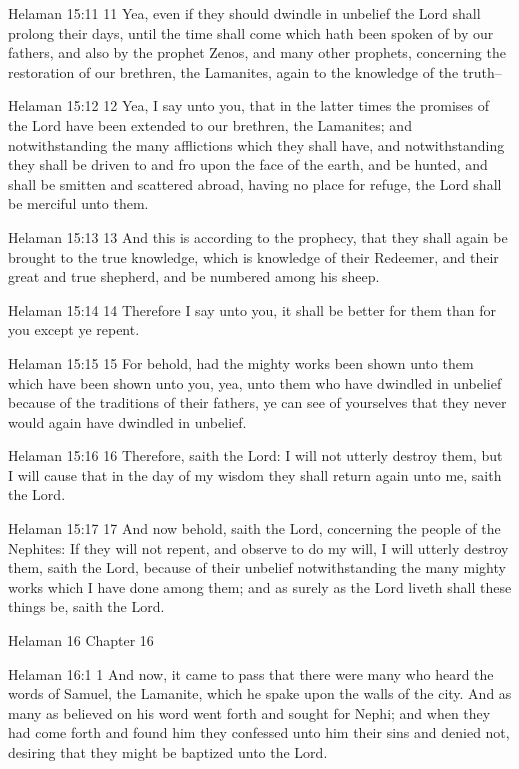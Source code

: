 Helaman 15:11
 11 Yea, even if they should dwindle in unbelief the Lord shall
prolong their days, until the time shall come which hath been
spoken of by our fathers, and also by the prophet Zenos, and many
other prophets, concerning the restoration of our brethren, the
Lamanites, again to the knowledge of the truth--

Helaman 15:12
 12 Yea, I say unto you, that in the latter times the promises of
the Lord have been extended to our brethren, the Lamanites; and
notwithstanding the many afflictions which they shall have, and
notwithstanding they shall be driven to and fro upon the face of
the earth, and be hunted, and shall be smitten and scattered
abroad, having no place for refuge, the Lord shall be merciful
unto them.

Helaman 15:13
 13 And this is according to the prophecy, that they shall again
be brought to the true knowledge, which is knowledge of their
Redeemer, and their great and true shepherd, and be numbered
among his sheep.

Helaman 15:14
 14 Therefore I say unto you, it shall be better for them than
for you except ye repent.

Helaman 15:15
 15 For behold, had the mighty works been shown unto them which
have been shown unto you, yea, unto them who have dwindled in
unbelief because of the traditions of their fathers, ye can see
of yourselves that they never would again have dwindled in
unbelief.

Helaman 15:16
 16 Therefore, saith the Lord: I will not utterly destroy them,
but I will cause that in the day of my wisdom they shall return
again unto me, saith the Lord.

Helaman 15:17
 17 And now behold, saith the Lord, concerning the people of the
Nephites: If they will not repent, and observe to do my will, I
will utterly destroy them, saith the Lord, because of their
unbelief notwithstanding the many mighty works which I have done
among them; and as surely as the Lord liveth shall these things
be, saith the Lord.

Helaman 16
Chapter 16

Helaman 16:1
 1 And now, it came to pass that there were many who heard the
words of Samuel, the Lamanite, which he spake upon the walls of
the city. And as many as believed on his word went forth and
sought for Nephi; and when they had come forth and found him they
confessed unto him their sins and denied not, desiring that they
might be baptized unto the Lord.

